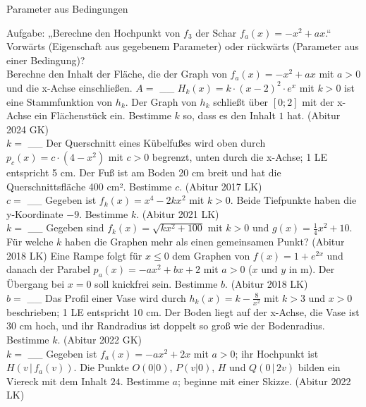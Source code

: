 \setcounter{aufgabe}{15}

\begin{aufgabe}{Parameter aus Bedingungen}
\begin{teile}
\teil Aufgabe: „Berechne den Hochpunkt von $f_3$ der Schar $f_a(x) = -x^2 + a x$.“ Vorwärts (Eigenschaft aus gegebenem Parameter) oder rückwärts (Parameter aus einer Bedingung)? \\  
\teil Berechne den Inhalt der Fläche, die der Graph von $f_a(x) = -x^2 + a x$ mit $a > 0$ und die x-Achse einschließen. $A =$ \_\_
\teil $H_k(x) = k \cdot (x - 2)^2 \cdot e^{x}$ mit $k > 0$ ist eine Stammfunktion von $h_k$. Der Graph von $h_k$ schließt über $[0; 2]$ mit der x-Achse ein Flächenstück ein. Bestimme $k$ so, dass es den Inhalt $1$ hat. \hfill (Abitur 2024 GK) \\ $k =$ \_\_
\teil Der Querschnitt eines Kübelfußes wird oben durch $p_c(x) = c \cdot (4 - x^2)$ mit $c > 0$ begrenzt, unten durch die x-Achse; 1 LE entspricht 5 cm. Der Fuß ist am Boden 20 cm breit und hat die Querschnittsfläche 400 cm². Bestimme $c$. \hfill (Abitur 2017 LK) \\ $c =$ \_\_
\teil Gegeben ist $f_k(x) = x^4 - 2k x^2$ mit $k > 0$. Beide Tiefpunkte haben die y-Koordinate $-9$. Bestimme $k$. \hfill (Abitur 2021 LK) \\ $k =$ \_\_
\teil Gegeben sind $f_k(x) = \sqrt{k x^2 + 100}$ mit $k > 0$ und $g(x) = \frac{1}{4}x^2 + 10$. Für welche $k$ haben die Graphen mehr als einen gemeinsamen Punkt? \hfill (Abitur 2018 LK)
\teil Eine Rampe folgt für $x \le 0$ dem Graphen von $f(x) = 1 + e^{2x}$ und danach der Parabel $p_a(x) = -a x^2 + b x + 2$ mit $a > 0$ ($x$ und $y$ in m). Der Übergang bei $x = 0$ soll knickfrei sein. Bestimme $b$. \hfill (Abitur 2018 LK) \\ $b =$ \_\_
\teil Das Profil einer Vase wird durch $h_k(x) = k - \frac{8}{x^2}$ mit $k > 3$ und $x > 0$ beschrieben; 1 LE entspricht 10 cm. Der Boden liegt auf der x-Achse, die Vase ist 30 cm hoch, und ihr Randradius ist doppelt so groß wie der Bodenradius. Bestimme $k$. \hfill (Abitur 2022 GK) \\ $k =$ \_\_
\teil Gegeben ist $f_a(x) = -a x^2 + 2x$ mit $a > 0$; ihr Hochpunkt ist $H(v \,|\, f_a(v))$. Die Punkte $O(0 | 0)$, $P(v | 0)$, $H$ und $Q(0 \,|\, 2v)$ bilden ein Viereck mit dem Inhalt $24$. Bestimme $a$; beginne mit einer Skizze. \hfill (Abitur 2022 LK) \\


\end{teile}
\end{aufgabe}
